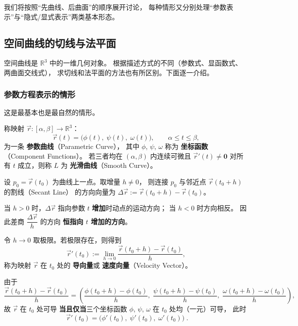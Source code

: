 \documentclass[lang=cn,11pt]{elegantbook}
\begin{document}
我们将按照“先曲线、后曲面”的顺序展开讨论，
每种情形又分别处理“参数表示”与“隐式/显式表示”两类基本形态。


\subsection{空间曲线的切线与法平面}

空间曲线是 $\mathbb R^3$ 中的一维几何对象。
根据描述方式的不同（参数式、显函数式、两曲面交线式），
求切线和法平面的方法也有所区别。下面逐一介绍。

\subsubsection*{参数方程表示的情形}

这是最基本也是最自然的情形。

\begin{definition}[空间参数曲线] \label{def:param-curve}
称映射 $\vec{r}:[\alpha,\beta]\to\mathbb R^3$：
\[
\vec{r}(t)=\bigl(\phi(t),\;\psi(t),\;\omega(t)\bigr),\qquad \alpha\leq t\leq\beta,
\]
为一条 \textbf{参数曲线}（Parametric Curve），
其中 $\phi$, $\psi$, $\omega$ 称为 \textbf{坐标函数}（Component Functions）。
若三者均在 $(\alpha,\beta)$ 内连续可微且 $\vec{r}'(t) \neq \boldsymbol{0}$ 对所有 $t$ 成立，则称 $L$ 为 \textbf{光滑曲线}（Smooth Curve）。
\end{definition}

\begin{note}[切向量的直观来源]
设 $p_0=\vec{r}(t_0)$ 为曲线上一点。取增量 $h \neq 0$，
则连接 $p_0$ 与邻近点 $\vec{r}(t_0+h)$ 的割线（Secant Line）
的方向向量为 $\Delta\vec{r}:=\vec{r}(t_0+h)-\vec{r}(t_0)$。

当 $h>0$ 时，$\Delta\vec{r}$ 指向参数 $t$ \textbf{增加}时动点的运动方向；
当 $h<0$ 时方向相反。
因此差商 $\dfrac{\Delta\vec{r}}{h}$ 的方向 \textbf{恒指向 $t$ 增加的方向}。

令 $h\to 0$ 取极限。若极限存在，则得到
\[
\vec{r}'(t_0):=\lim_{h\to 0}\frac{\vec{r}(t_0+h)-\vec{r}(t_0)}{h},
\]
称为映射 $\vec{r}$ 在 $t_0$ 处的 \textbf{导向量}或 \textbf{速度向量}（Velocity Vector）。
\end{note}

由于
\[
\frac{\vec{r}(t_0+h)-\vec{r}(t_0)}{h}
=\left(\frac{\phi(t_0+h)-\phi(t_0)}{h},\;
       \frac{\psi(t_0+h)-\psi(t_0)}{h},\;
       \frac{\omega(t_0+h)-\omega(t_0)}{h}\right),
\]
故 $\vec{r}$ 在 $t_0$ 处可导 \textbf{当且仅当}三个坐标函数
$\phi$, $\psi$, $\omega$ 在 $t_0$ 处均（一元）可导，
此时
\[
\boxed{\;\vec{r}'(t_0)
=\bigl(\phi'(t_0),\;\psi'(t_0),\;\omega'(t_0)\bigr)\;}.
\]
\end{document}
